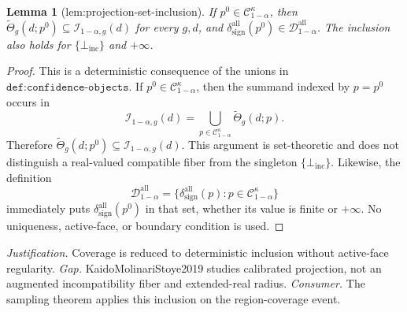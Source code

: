 \documentclass{article}
\newtheorem{lemma}{Lemma}
\begin{document}
\begin{lemma}[lem:projection-set-inclusion]\label{lem:projection-set-inclusion}
If \(p^0\in\mathcal C_{1-\alpha}^{\kappa}\), then \(\widetilde\Theta_g(d;p^0)\subseteq\mathcal I_{1-\alpha,g}(d)\) for every \(g,d\), and \(\delta_{\mathrm{sign}}^{\mathrm{all}}(p^0)\in\mathcal D_{1-\alpha}^{\mathrm{all}}\). The inclusion also holds for \(\{\bot_{\mathrm{inc}}\}\) and \(+\infty\).
\end{lemma}
\begin{proof}
This is a deterministic consequence of the unions in \(\texttt{def:confidence-objects}\).  If \(p^0\in\mathcal C_{1-\alpha}^{\kappa}\), then the summand indexed by \(p=p^0\) occurs in
\[
 \mathcal I_{1-\alpha,g}(d)
 =\bigcup_{p\in\mathcal C_{1-\alpha}^{\kappa}}
   \widetilde\Theta_g(d;p).
\]
Therefore \(\widetilde\Theta_g(d;p^0)\subseteq\mathcal I_{1-\alpha,g}(d)\).  This argument is set-theoretic and does not distinguish a real-valued compatible fiber from the singleton \(\{\bot_{\mathrm{inc}}\}\).  Likewise, the definition
\[
 \mathcal D_{1-\alpha}^{\mathrm{all}}
 =\{\delta_{\mathrm{sign}}^{\mathrm{all}}(p):
      p\in\mathcal C_{1-\alpha}^{\kappa}\}
\]
immediately puts \(\delta_{\mathrm{sign}}^{\mathrm{all}}(p^0)\) in that set, whether its value is finite or \(+\infty\).  No uniqueness, active-face, or boundary condition is used.
\end{proof}
\par\smallskip\noindent \textit{Justification.} Coverage is reduced to deterministic inclusion without active-face regularity. \textit{Gap.} KaidoMolinariStoye2019 studies calibrated projection, not an augmented incompatibility fiber and extended-real radius. \textit{Consumer.} The sampling theorem applies this inclusion on the region-coverage event.
\end{document}
